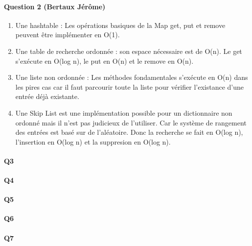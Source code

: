\documentclass[a4paper]{article}
\begin{document}
\paragraph{Question 2 (Bertaux Jérôme)}
\begin{enumerate}
\item Une hashtable : Les opérations basiques de la Map get, put et remove peuvent être implémenter en O(1).
\item Une table de recherche ordonnée : son espace nécessaire est de O(n). Le get s'exécute en O(log n), le put en O(n) et le remove en O(n).
\item Une liste non ordonnée : Les méthodes fondamentales s'exécute en O(n) dans les pires cas car il faut parcourir toute la liste pour vérifier l'existance d'une entrée déjà existante.
\item Une Skip List est une implémentation possible pour un dictionnaire non ordonné mais il n'est pas judicieux de l'utiliser. Car le système de rangement des entrées est basé sur de l'aléatoire. Donc la recherche se fait en O(log n), l'insertion en O(log n) et la suppresion en O(log n).
\end{enumerate}

\paragraph{Q3}

\paragraph{Q4}

\paragraph{Q5}

\paragraph{Q6}

\paragraph{Q7}
\end{document}
